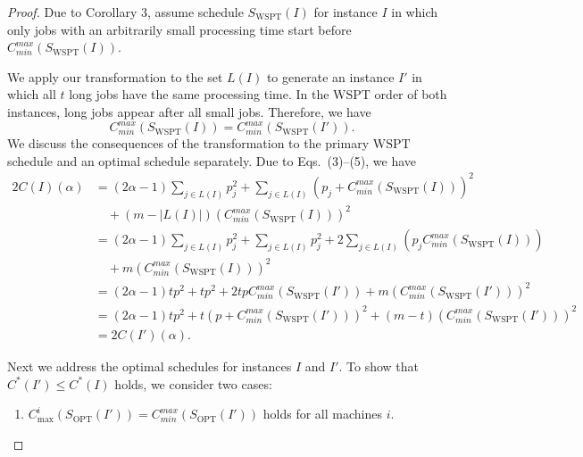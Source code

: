 \documentclass[11pt]{article}
\newcommand{\WSPT}{\mathrm{WSPT}}
\newcommand{\OPT}{\mathrm{OPT}}
\newcommand{\Cminmax}{C_{min}^{max}}
\begin{document}
\begin{proof}
Due to Corollary 3, assume schedule $S_{\WSPT}(I)$ for instance $I$ in which
only jobs with an arbitrarily small processing time start before
$\Cminmax(S_{\WSPT}(I))$.

We apply our transformation to the set $L(I)$ to generate an instance $I'$ in
which all $t$ long jobs have the same processing time. In the \(\mathrm{WSPT}\) order of
both instances, long jobs appear after all small jobs. Therefore, we have
\[
        \Cminmax(S_{\WSPT}(I))=\Cminmax(S_{\WSPT}(I')).
\]
We discuss the consequences of the transformation to the primary \(\mathrm{WSPT}\) schedule
and an optimal schedule separately. Due to Eqs.~(3)--(5), we have
\[
\begin{aligned}
        2C(I)(\alpha)
        &=
        (2\alpha-1)\sum_{j\in L(I)}p_j^2
        +
        \sum_{j\in L(I)}(p_j+\Cminmax(S_{\WSPT}(I)))^2                  \\
        &\quad
        +(m-|L(I)|)(\Cminmax(S_{\WSPT}(I)))^2                           \\
        &=
        (2\alpha-1)\sum_{j\in L(I)}p_j^2
        +
        \sum_{j\in L(I)}p_j^2
        +
        2\sum_{j\in L(I)}(p_j\Cminmax(S_{\WSPT}(I)))               \\
        &\quad
        +m(\Cminmax(S_{\WSPT}(I)))^2                                    \\
        &=
        (2\alpha-1)tp^2+tp^2
        +2tp\Cminmax(S_{\WSPT}(I'))
        +m(\Cminmax(S_{\WSPT}(I')))^2                                  \\
        &=
        (2\alpha -1)tp^2
        +t(p+\Cminmax(S_{\WSPT}(I')))^2
        +(m-t)(\Cminmax(S_{\WSPT}(I')))^2                              \\
        &=
        2C(I')(\alpha).
\end{aligned}
\]

Next we address the optimal schedules for instances $I$ and $I'$. To show
that $C^*(I')\leq C^*(I)$ holds, we consider two cases:

\begin{enumerate}[label=(\arabic*)]
\item
$C_{\max}^i(S_{\OPT}(I'))=\Cminmax(S_{\OPT}(I'))$ holds for all machines $i$.


\end{enumerate}
\end{proof}
\end{document}
